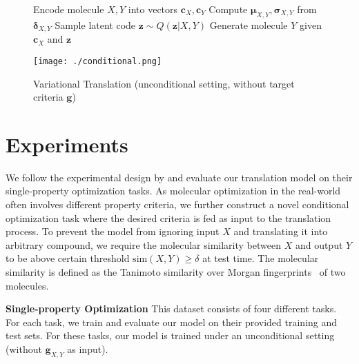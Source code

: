 \documentclass{article} \usepackage{iclr2020_conference,times}
\def\vmu{{\bm{\mu}}}
\def\vdelta{{\bm{\delta}}}
\def\vsigma{{\bm{\sigma}}}
\def\vc{{\bm{c}}}
\def\vg{{\bm{g}}}
\def\vz{{\bm{z}}}
\begin{document}
\begin{figure}
\begin{minipage}{0.5\textwidth}
\begin{algorithm}[H]
\begin{algorithmic}[1]
\caption{Variational Translation (unconditional setting, without target criteria $\vg$)}
\STATE Encode molecule $X,Y$ into vectors $\vc_X, \vc_Y$
\STATE Compute $\vmu_{X,Y}, \vsigma_{X,Y}$ from $\vdelta_{X,Y}$
\STATE Sample latent code $\vz \sim Q(\vz | X, Y)$
\STATE Generate molecule $Y$ given $\vc_X$ and $\vz$
\ENDFOR
\end{algorithmic}
\end{algorithm}
\end{minipage}
\hfill 
\begin{minipage}{0.48\textwidth}
\vspace{10pt}
\centering
\texttt{[image: ./conditional.png]}
\end{minipage}
\end{figure}

 \section{Experiments}
\label{sec:experiment}
\newcommand\Tstrut{\rule{0pt}{2.3ex}}
\newcommand\Bstrut{\rule[-0.9ex]{0pt}{0pt}}

We follow the experimental design by \citet{jin2018learning} and evaluate our translation model on their single-property optimization tasks.
As molecular optimization in the real-world often involves different property criteria, we further construct a novel conditional optimization task where the desired criteria is fed as input to the translation process.
To prevent the model from ignoring input $X$ and translating it into arbitrary compound, we require the molecular similarity between $X$ and output $Y$ to be above certain threshold $\mathrm{sim}(X,Y) \geq \delta$ at test time. The molecular similarity is defined as the Tanimoto similarity over Morgan fingerprints~\citep{rogers2010extended} of two molecules.

\textbf{Single-property Optimization } This dataset consists of four different tasks. For each task, we train and evaluate our model on their provided training and test sets. For these tasks, our model is trained under an unconditional setting (without $\vg_{X,Y}$ as input).  
\end{document}
